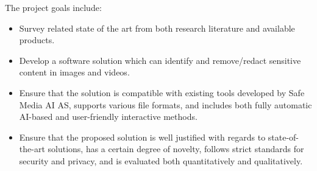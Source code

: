 The project goals include:

\begin{itemize}
    \item Survey related state of the art from both research literature and available products.
    \item Develop a software solution which can identify and remove/redact sensitive content in images and videos.
    \item Ensure that the solution is compatible with existing tools developed by Safe Media AI AS, supports various file formats, and includes both fully automatic AI-based and user-friendly interactive methods.
    \item Ensure that the proposed solution is well justified with regards to state-of-the-art solutions, has a certain degree of novelty, follows strict standards for security and privacy, and is evaluated both quantitatively and qualitatively.
\end{itemize}
